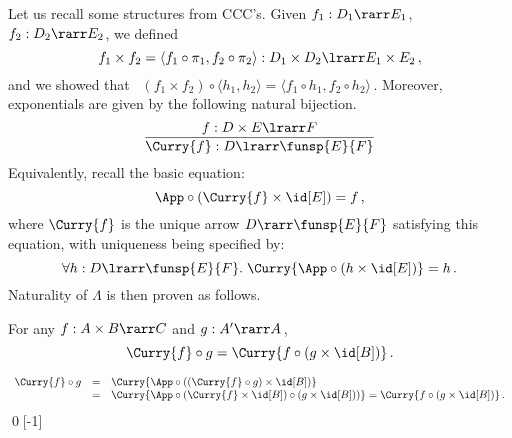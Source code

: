 \documentclass{svmult}
\begin{document}
Let us recall some structures from CCC's. Given $f_{1} : D_{1} \rarr E_{1}$,   $f_{2} : D_{2} \rarr E_{2}$, we defined
\[ f_{1} \times f_{2}  = \langle f_{1} \circ \pi_{1},  f_{2} \circ \pi_{2} \rangle : D_{1} \times D_{2} \lrarr E_{1} \times E_{2}\,, \]
and we showed that \ $(f_1\times f_2)\circ\langle h_1,h_2\rangle = \langle f_1\circ h_1, f_2\circ h_2\rangle$\,.
%
Moreover, exponentials are given by the following natural bijection.
\[ \frac{f : D \times E \lrarr F}{\Curry{f} : D \lrarr \funsp{E}{F}} \]
Equivalently, recall the basic equation:
\[ \App \circ (\Curry{f} \times \id[E] ) = f\,, \]
where $\Curry{f}$ is the unique arrow $D\rarr\funsp{E}{F}$ satisfying this equation, with uniqueness being specified by:
\[ \forall h : D \lrarr \funsp{E}{F}. \; \Curry{\App \circ (h \times \id[E])} = h\,. \]
%
Naturality of $\Lambda$ is then proven as follows.

\begin{myproposition}%
\label{p:Curry}
For any $f:A\times B\rarr C$ and $g:A'\rarr A$\,,
\[ \Curry{f} \circ g = \Curry{f \circ (g \times \id[B])}\,. \]
\end{myproposition}
\proof
\[ \begin{array}{rcl}
 \Curry{f} \circ g & = & \Curry{\App \circ ((\Curry{f} \circ g) \times \id[B])} \\
 & = & \Curry{\App \circ (\Curry{f}\times \id[B]) \circ (g \times \id[B])) } = \Curry{f \circ (g \times \id[B])}\,.
\end{array}\]
\qed[-1]
\end{document}

